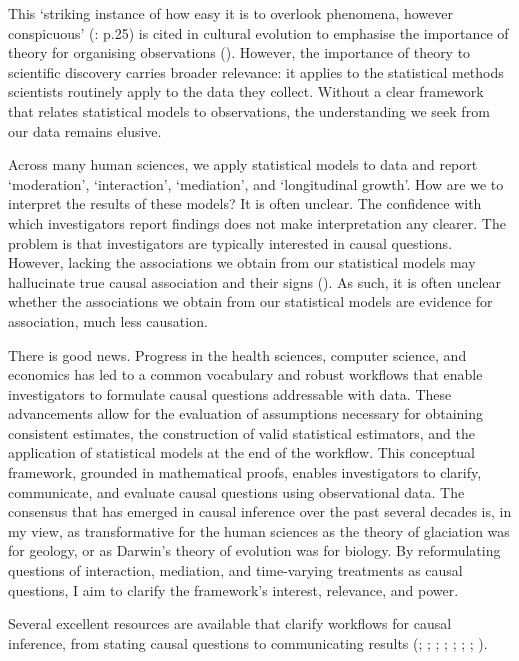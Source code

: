 \documentclass[
  single column]{article}
\begin{document}
This `striking instance of how easy it is to overlook phenomena, however
conspicuous' (: p.25) is cited
in cultural evolution to emphasise the importance of theory for
organising observations (). However, the importance of theory to scientific discovery
carries broader relevance: it applies to the statistical methods
scientists routinely apply to the data they collect. Without a clear
framework that relates statistical models to observations, the
understanding we seek from our data remains elusive.

Across many human sciences, we apply statistical models to data and
report `moderation', `interaction', `mediation', and `longitudinal
growth'. How are we to interpret the results of these models? It is
often unclear. The confidence with which investigators report findings
does not make interpretation any clearer. The problem is that
investigators are typically interested in causal questions. However,
lacking the associations we obtain from our statistical models may
hallucinate true causal association and their signs
(). As such,
it is often unclear whether the associations we obtain from our
statistical models are evidence for association, much less causation.

There is good news. Progress in the health sciences, computer science,
and economics has led to a common vocabulary and robust workflows that
enable investigators to formulate causal questions addressable with
data. These advancements allow for the evaluation of assumptions
necessary for obtaining consistent estimates, the construction of valid
statistical estimators, and the application of statistical models at the
end of the workflow. This conceptual framework, grounded in mathematical
proofs, enables investigators to clarify, communicate, and evaluate
causal questions using observational data. The consensus that has
emerged in causal inference over the past several decades is, in my
view, as transformative for the human sciences as the theory of
glaciation was for geology, or as Darwin's theory of evolution was for
biology. By reformulating questions of interaction, mediation, and
time-varying treatments as causal questions, I aim to clarify the
framework's interest, relevance, and power.

Several excellent resources are available that clarify workflows for
causal inference, from stating causal questions to communicating results
(;
;
;
;
;
; ; ).
\end{document}
